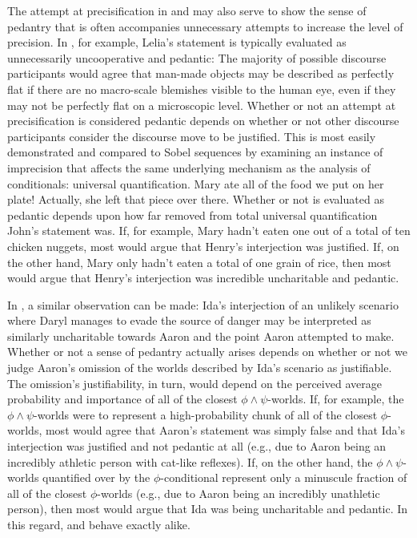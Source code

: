 The attempt at precisification in  and  may also serve to show the sense of pedantry that is often accompanies unnecessary attempts to increase the level of precision. In , for example, Lelia's statement is typically evaluated as unnecessarily uncooperative and pedantic: The majority of possible discourse participants would agree that man-made objects may be described as perfectly flat if there are no macro-scale blemishes visible to the human eye, even if they may not be perfectly flat on a microscopic level. Whether or not an attempt at precisification is considered pedantic depends on whether or not other discourse participants consider the discourse move to be justified. This is most easily demonstrated and compared to Sobel sequences by examining an instance of imprecision that affects the same underlying mechanism as the analysis of conditionals: universal quantification.
\pex{}%
			\a	{}Mary ate all of the food we put on her plate!
			\a	{}Actually, she left that piece over there.
\xe
Whether or not  is evaluated as pedantic depends upon how far removed from total universal quantification John's statement was. If, for example, Mary hadn't eaten one out of a total of ten chicken nuggets, most would argue that Henry's interjection was justified. If, on the other hand, Mary only hadn't eaten a total of one grain of rice, then most would argue that Henry's interjection was incredible uncharitable and pedantic.

In , a similar observation can be made: Ida's interjection of an unlikely scenario where Daryl manages to evade the source of danger may be interpreted as similarly uncharitable towards Aaron and the point Aaron attempted to make. Whether or not a sense of pedantry actually arises depends on whether or not we judge Aaron's omission of the worlds described by Ida's scenario as justifiable. The omission's justifiability, in turn, would depend on the perceived average probability and importance of all of the closest $\phi\land\psi$-worlds. If, for example, the $\phi\land\psi$-worlds were to represent a high-probability chunk of all of the closest $\phi$-worlds, most would agree that Aaron's statement was simply false and that Ida's interjection was justified and not pedantic at all (e.g., due to Aaron being an incredibly athletic person with cat-like reflexes). If, on the other hand, the $\phi\land\psi$-worlds quantified over by the $\phi$-conditional represent only a minuscule fraction of all of the closest $\phi$-worlds (e.g., due to Aaron being an incredibly unathletic person), then most would argue that Ida was being uncharitable and pedantic. In this regard,  and  behave exactly alike.

